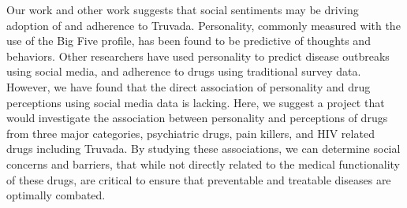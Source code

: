 Our work and other work suggests that social sentiments may be driving adoption of and adherence to Truvada. Personality, commonly measured with the use of the Big Five profile, has been found to be predictive of thoughts and behaviors. Other researchers have used personality to predict disease outbreaks using social media, and adherence to drugs using traditional survey data. However, we have found that the direct association of personality and drug perceptions using social media data is lacking. Here, we suggest a project that would investigate the association between personality and perceptions of drugs from three major categories, psychiatric drugs, pain killers, and HIV related drugs including Truvada. By studying these associations, we can determine social concerns and barriers, that while not directly related to the medical functionality of these drugs, are  critical to ensure that preventable and treatable diseases are optimally combated.
